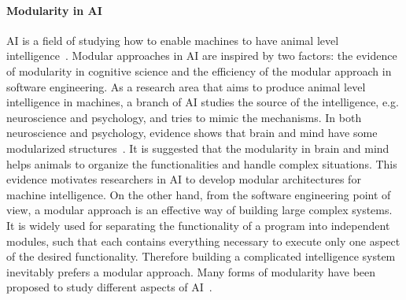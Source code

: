 \paragraph{Modularity in AI}
AI is a field of studying how to enable machines to have animal level intelligence~\citep{brooks1991intelligence}. Modular approaches in AI are inspired by two factors: the evidence of modularity in cognitive science and the efficiency of the modular approach in software engineering.
As a research area that aims to produce animal level intelligence in machines, a branch of AI studies the source of the intelligence, e.g. neuroscience and psychology, and tries to mimic the mechanisms. In both neuroscience and psychology, evidence shows that brain and mind have some modularized structures~\citep{fodor1983modularity,peretz2003modularity,barrett2006modularity,sztarker2011brain}. It is suggested that the modularity in brain and mind helps animals to organize the functionalities and handle complex situations. This evidence motivates researchers in AI to develop modular architectures for machine intelligence. On the other hand, from the software engineering point of view, a modular approach is an effective way of building large complex systems. It is widely used for separating the functionality of a program into independent modules, such that each contains everything necessary to execute only one aspect of the desired functionality. Therefore building a complicated intelligence system inevitably prefers a modular approach. Many forms of modularity have been proposed to study different aspects of AI~\citep{bryson2004modular}.


